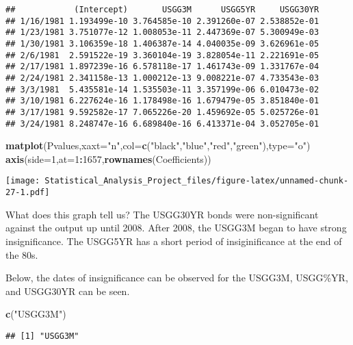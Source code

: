 \documentclass[]{article}
\newenvironment{Shaded}{\begin{snugshade}}{\end{snugshade}}
\newcommand{\KeywordTok}[1]{\textcolor[rgb]{0.13,0.29,0.53}{\textbf{#1}}}
\newcommand{\DataTypeTok}[1]{\textcolor[rgb]{0.13,0.29,0.53}{#1}}
\newcommand{\DecValTok}[1]{\textcolor[rgb]{0.00,0.00,0.81}{#1}}
\newcommand{\StringTok}[1]{\textcolor[rgb]{0.31,0.60,0.02}{#1}}
\newcommand{\OperatorTok}[1]{\textcolor[rgb]{0.81,0.36,0.00}{\textbf{#1}}}
\newcommand{\NormalTok}[1]{#1}
\begin{document}
\begin{verbatim}
##            (Intercept)       USGG3M      USGG5YR     USGG30YR
## 1/16/1981 1.193499e-10 3.764585e-10 2.391260e-07 2.538852e-01
## 1/23/1981 3.751077e-12 1.008053e-11 2.447369e-07 5.300949e-03
## 1/30/1981 3.106359e-18 1.406387e-14 4.040035e-09 3.626961e-05
## 2/6/1981  2.591522e-19 3.360104e-19 3.828054e-11 2.221691e-05
## 2/17/1981 1.897239e-16 6.578118e-17 1.461743e-09 1.331767e-04
## 2/24/1981 2.341158e-13 1.000212e-13 9.008221e-07 4.733543e-03
## 3/3/1981  5.435581e-14 1.535503e-11 3.357199e-06 6.010473e-02
## 3/10/1981 6.227624e-16 1.178498e-16 1.679479e-05 3.851840e-01
## 3/17/1981 9.592582e-17 7.065226e-20 1.459692e-05 5.025726e-01
## 3/24/1981 8.248747e-16 6.689840e-16 6.413371e-04 3.052705e-01
\end{verbatim}

\begin{Shaded}
\begin{Highlighting}[]
\KeywordTok{matplot}\NormalTok{(Pvalues,}\DataTypeTok{xaxt=}\StringTok{"n"}\NormalTok{,}\DataTypeTok{col=}\KeywordTok{c}\NormalTok{(}\StringTok{"black"}\NormalTok{,}\StringTok{"blue"}\NormalTok{,}\StringTok{"red"}\NormalTok{,}\StringTok{"green"}\NormalTok{),}\DataTypeTok{type=}\StringTok{"o"}\NormalTok{)}
\KeywordTok{axis}\NormalTok{(}\DataTypeTok{side=}\DecValTok{1}\NormalTok{,}\DataTypeTok{at=}\DecValTok{1}\OperatorTok{:}\DecValTok{1657}\NormalTok{,}\KeywordTok{rownames}\NormalTok{(Coefficients))}
\end{Highlighting}
\end{Shaded}

\texttt{[image: Statistical\_Analysis\_Project\_files/figure-latex/unnamed-chunk-27-1.pdf]}

What does this graph tell us? The USGG30YR bonds were non-significant
against the output up until 2008. After 2008, the USGG3M began to have
strong insignificance. The USGG5YR has a short period of insiginificance
at the end of the 80s.

Below, the dates of insignificance can be observed for the USGG3M,
USGG\%YR, and USGG30YR can be seen.

\begin{Shaded}
\begin{Highlighting}[]
\KeywordTok{c}\NormalTok{(}\StringTok{"USGG3M"}\NormalTok{)}
\end{Highlighting}
\end{Shaded}

\begin{verbatim}
## [1] "USGG3M"
\end{verbatim}
\end{document}
